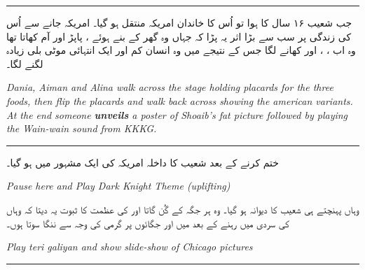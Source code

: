 \documentclass{article}
\begin{document}
\rule{\textwidth}{1pt}

جب شعیب ۱۶ سال کا ہوا تو اُس کا خاندان امریکہ منتقل ہو گیا۔
امریکہ جانے سے اُس کی زندگی پر سب سے بڑا اثر یہ پڑا کہ جہاں وہ گھر کے بنے ہوئے ، پاپڑ اور آم کھاتا تھا وہ اب ، ، اور  کھانے لگا جس کے نتیجے میں وہ انسان کم اور ایک انتہائی موٹی بلی زیادہ لگنے لگا۔  

\begin{enpara}
	\itshape
	Dania, Aiman and Alina walk across the stage holding placards for the three foods, then flip the placards and walk back across showing the american variants. At the end someone \textbf{unveils} a poster of Shoaib's fat picture followed by playing the Wain-wain sound from KKKG.
\end{enpara}

\rule{\textwidth}{1pt}

 ختم کرنے کے بعد شعیب کا داخلہ امریکہ کی ایک مشہور  میں ہو گیا۔
\begin{enpara}
	\itshape
	Pause here and Play Dark Knight Theme (uplifting)
\end{enpara}

\vspace{0.5\baselineskip}
وہاں پہنچتے ہی شعیب  کا دیوانہ ہو گیا۔
وہ ہر جگہ  کے گُن گاتا اور  کی عظمت کا ثبوت یہ دیتا کہ وہاں کی سردی میں رہنے کے بعد میں اور جگائوں پر گرمی کی وجہ سے ننگا سوتا ہوں۔ \hfill {}

\begin{enpara}
	\itshape
	Play teri galiyan and show slide-show of Chicago pictures
\end{enpara}

\rule{\textwidth}{1pt}
\end{document}

